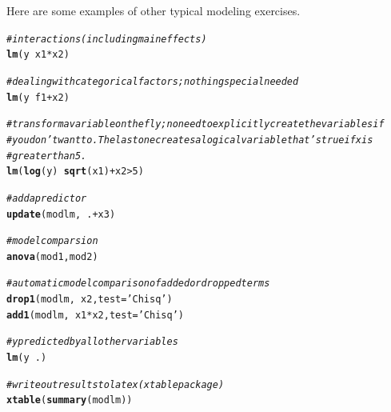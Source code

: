 \documentclass[english,nohyper,titlepage]{tufte-handout}\usepackage[]{graphicx}\usepackage[]{color}
\makeatletter
\newcommand{\hlnum}[1]{\textcolor[rgb]{0.686,0.059,0.569}{#1}}%
\newcommand{\hlstr}[1]{\textcolor[rgb]{0.192,0.494,0.8}{#1}}%
\newcommand{\hlcom}[1]{\textcolor[rgb]{0.678,0.584,0.686}{\textit{#1}}}%
\newcommand{\hlopt}[1]{\textcolor[rgb]{0,0,0}{#1}}%
\newcommand{\hlstd}[1]{\textcolor[rgb]{0.345,0.345,0.345}{#1}}%
\newcommand{\hlkwc}[1]{\textcolor[rgb]{0.333,0.667,0.333}{#1}}%
\newcommand{\hlkwd}[1]{\textcolor[rgb]{0.737,0.353,0.396}{\textbf{#1}}}%
\newenvironment{kframe}{%
 \def\at@end@of@kframe{}%
 \ifinner\ifhmode%
  \def\at@end@of@kframe{\end{minipage}}%
  \begin{minipage}{\columnwidth}%
 \fi\fi%
 \def\FrameCommand##1{\hskip\@totalleftmargin \hskip-\fboxsep
 \colorbox{shadecolor}{##1}\hskip-\fboxsep
     \hskip-\linewidth \hskip-\@totalleftmargin \hskip\columnwidth}%
 \MakeFramed {\advance\hsize-\width
   \@totalleftmargin\z@ \linewidth\hsize
   \@setminipage}}%
 {\par\unskip\endMakeFramed%
 \at@end@of@kframe}
\newenvironment{knitrout}{}{} %
\makeatother
\begin{document}
\noindent Here are some examples of other typical modeling exercises.

\begin{knitrout}\footnotesize
{}\color{fgcolor}\begin{kframe}
\begin{alltt}
\hlcom{# interactions (including main effects)}
\hlkwd{lm}\hlstd{(y} \hlopt{~} \hlstd{x1}\hlopt{*}\hlstd{x2)}

\hlcom{# dealing with categorical factors; nothing special needed}
\hlkwd{lm}\hlstd{(y} \hlopt{~} \hlstd{f1} \hlopt{+} \hlstd{x2)}

\hlcom{# transform a variable on the fly; no need to explicitly create the variables if}
\hlcom{# you don't want to. The last one creates a logical variable that's true if x is}
\hlcom{# greater than 5.}
\hlkwd{lm}\hlstd{(}\hlkwd{log}\hlstd{(y)} \hlopt{~} \hlkwd{sqrt}\hlstd{(x1)} \hlopt{+} \hlstd{x2}\hlopt{>}\hlnum{5}\hlstd{)}

\hlcom{# add a predictor}
\hlkwd{update}\hlstd{(modlm,} \hlopt{~}\hlstd{.} \hlopt{+} \hlstd{x3)}

\hlcom{# model comparsion}
\hlkwd{anova}\hlstd{(mod1, mod2)}

\hlcom{# automatic model comparison of added or dropped terms}
\hlkwd{drop1}\hlstd{(modlm,} \hlopt{~} \hlstd{x2,} \hlkwc{test}\hlstd{=}\hlstr{'Chisq'}\hlstd{)}
\hlkwd{add1}\hlstd{(modlm,} \hlopt{~} \hlstd{x1}\hlopt{*}\hlstd{x2,} \hlkwc{test}\hlstd{=}\hlstr{'Chisq'}\hlstd{)}

\hlcom{# y predicted by all other variables}
\hlkwd{lm}\hlstd{(y} \hlopt{~} \hlstd{.)}

\hlcom{# write out results to latex (xtable package)}
\hlkwd{xtable}\hlstd{(}\hlkwd{summary}\hlstd{(modlm))}
\end{alltt}
\end{kframe}
\end{knitrout}
\end{document}

